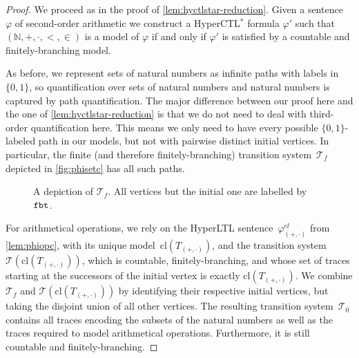 \documentclass[dvipsnames,10pt,a4paper]{amsart}
\theoremstyle{definition}
\theoremstyle{remark}
\newcommand{\nats}{\mathbb{N}}
\renewcommand{\phi}{\varphi}
\newcommand\Nat{\nats}
\newcommand{\tsys}{\mathcal{T}}
\newcommand{\hyltl}{{HyperLTL}\xspace}
\newcommand{\hyctlstar}{{HyperCTL$^*$}\xspace}
\newcommand\fbt{\textup{\texttt{fbt}}}
\newcommand\phiop{\varphi_{({+},{\cdot})}}
\newcommand\Top{T_{({+},{\cdot})}}
\renewcommand{\phi}{\varphi}
\newcommand\tsysc{\tsys_0}
\newcommand{\closure}[1]{\mathrm{cl}(#1)}
\newcommand{\phiopc}{\phiop^{cl}}
\begin{document}
\begin{proof}
We proceed as in the proof of \autoref{lem:hyctlstar-reduction}.
  Given a sentence~$\phi$ of second-order arithmetic we construct a \hyctlstar formula $\varphi'$ such that
  $(\Nat, +, \cdot, <,\in)$ is a model of $\varphi$ if and only if
  $\varphi'$ is satisfied by a countable and finitely-branching model.

As before, we represent sets of natural numbers
  as infinite paths with labels in $\{0,1\}$, so quantification over sets of natural numbers and natural numbers is captured by path quantification.
The major difference between our proof here and the one of \autoref{lem:hyctlstar-reduction} is that we do not need to deal with third-order quantification here.
This means we only need to have every possible $\{0,1\}$-labeled path in our models, but not with pairwise distinct initial vertices.
In particular, the finite (and therefore finitely-branching) transition system~$\tsys_f$ depicted in \autoref{fig:phisetc} has all such paths.

\begin{figure}
    \centering
\def\dist{2.0cm}
    \caption{A depiction of $\tsys_f$. All vertices but the initial one are labelled by $\fbt$.
}%

    \label{fig:phisetc}
\end{figure}

For arithmetical operations, we rely on the \hyltl sentence~$\phiopc$ from
  \autoref{lem:phiopc}, with its unique model~$\closure{\Top}$, and the transition system~$\tsys(\closure{\Top})$, which is countable, finitely-branching, and whose set of traces starting at the successors of the initial vertex is exactly $\closure{\Top}$.
  We combine $\tsys_f$ and $\tsys(\closure{\Top})$ by identifying their respective initial vertices, but taking the disjoint union of all other vertices.
  The resulting transition system~$\tsysc$ contains all traces encoding the subsets of the natural numbers as well as the traces required to model arithmetical operations.
  Furthermore, it is still countable and finitely-branching.
  

\end{proof}
\end{document}
